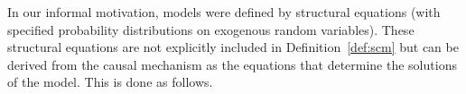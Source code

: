 \begin{Rem}
\end{Rem}

In our informal motivation, models were defined by structural equations (with specified
probability distributions on exogenous random variables). These structural equations are not 
explicitly included in Definition~\ref{def:scm} but can be derived from the causal mechanism
as the equations that determine the solutions of the model. This is done as follows.

